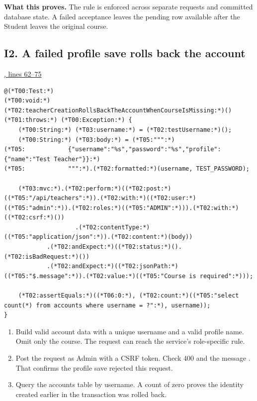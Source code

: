 \textbf{What this proves.}
The rule is enforced across separate requests and committed database state. A
failed acceptance leaves the pending row available after the Student leaves
the original course.

\clearpage
\subsection{I2. A failed profile save rolls back the account}
\par\smallskip
{\small\href{\repo/blob/5d22aed7f6d4ef1e4c0b0c0dabf2962ba4b47608/src/test/java/com/example/fmschool/EnrollmentPersistenceIT.java#L62-L75}{, lines 62--75}}
\begin{lstlisting}[style=vsJava,firstnumber=62]
@(*T00:Test:*)
(*T00:void:*) (*T02:teacherCreationRollsBackTheAccountWhenCourseIsMissing:*)() (*T01:throws:*) (*T00:Exception:*) {
    (*T00:String:*) (*T03:username:*) = (*T02:testUsername:*)();
    (*T00:String:*) (*T03:body:*) = (*T05:""":*)
(*T05:            {"username":"%s","password":"%s","profile":{"name":"Test Teacher"}}:*)
(*T05:            """:*).(*T02:formatted:*)(username, TEST_PASSWORD);

    (*T03:mvc:*).(*T02:perform:*)((*T02:post:*)((*T05:"/api/teachers":*)).(*T02:with:*)((*T02:user:*)((*T05:"admin":*)).(*T02:roles:*)((*T05:"ADMIN":*))).(*T02:with:*)((*T02:csrf:*)())
                    .(*T02:contentType:*)((*T05:"application/json":*)).(*T02:content:*)(body))
            .(*T02:andExpect:*)((*T02:status:*)().(*T02:isBadRequest:*)())
            .(*T02:andExpect:*)((*T02:jsonPath:*)((*T05:"$.message":*)).(*T02:value:*)((*T05:"Course is required":*)));

    (*T02:assertEquals:*)((*T06:0:*), (*T02:count:*)((*T05:"select count(*) from accounts where username = ?":*), username));
}
\end{lstlisting}


\begin{enumerate}
\item Build valid account data with a unique username and a valid profile name.
Omit only the course. The request can reach the service's role-specific rule.
\item Post the request as Admin with a CSRF token. Check 400 and the message
. That confirms the profile save rejected this request.
\item Query the accounts table by username. A count of zero proves the identity
created earlier in the transaction was rolled back.
\end{enumerate}

